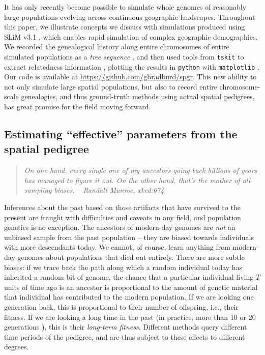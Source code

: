 \documentclass{ar-1col}
\newcommand{\todo}[1]{{\textbf{\color{red}{#1}}}}
\renewcommand{\emph}[1]{{\textit{#1}}}
\begin{document}
It has only recently become possible to simulate whole genomes
of reasonably large populations
evolving across continuous geographic landscapes.
Throughout this paper, 
we illustrate concepts we discuss with simulations 
produced using SLiM v3.1 \citep{haller2018forward},
which enables rapid simulation of complex geographic demographies.
We recorded the genealogical history along entire chromosomes
of entire simulated populations
as a \emph{tree sequence} \citep{kelleher2018efficient},
and then used tools from \texttt{tskit} to extract relatedness information \todo{ref for tskit? is it just msprime?},
plotting the results in \texttt{python} with \texttt{matplotlib} \citep{hunter2007matplotlib}.
Our code is available at \url{https://github.com/gbradburd/spgr}.
This new ability to not only simulate large spatial populations,
but also to record entire chromosome-scale genealogies,
and thus ground-truth methods using actual spatial pedigrees,
has great promise for the field moving forward.


\subsection{Estimating ``effective'' parameters from the spatial pedigree}

\begin{quote}
    \textit{
    On one hand, every single one of my ancestors going back billions of years
    has managed to figure it out.
    On the other hand, that's the mother of all sampling biases.}
    \hfill \textit{-- Randall Munroe, xkcd:674}
\end{quote}

Inferences about the past
based on those artifacts that have survived to the present
are fraught with difficulties and caveats in any field, 
and population genetics is no exception.
The ancestors of modern-day genomes are \textit{not} an unbiased sample
from the past population -- 
they are biased towards individuals with more descendants today.
We cannot, of course, learn anything from modern-day genomes
about populations that died out entirely.
There are more subtle biases:
if we trace back the path along which a random individual today 
has inherited a random bit of genome,
the chance that a particular individual living $T$ units of time ago is an ancestor
is proportional to the amount of genetic material that individual has contributed to the modern population.
If we are looking one generation back, 
this is proportional to their number of offspring, i.e., their fitness.
If we are looking a long time in the past
(in practice, more than 10 or 20 generations \citep{BartonEtheridge2011fitness}),
this is their \textit{long-term fitness}.
Different methods query different time periods of the pedigree,
and are thus subject to these effects to different degrees.
\end{document}
